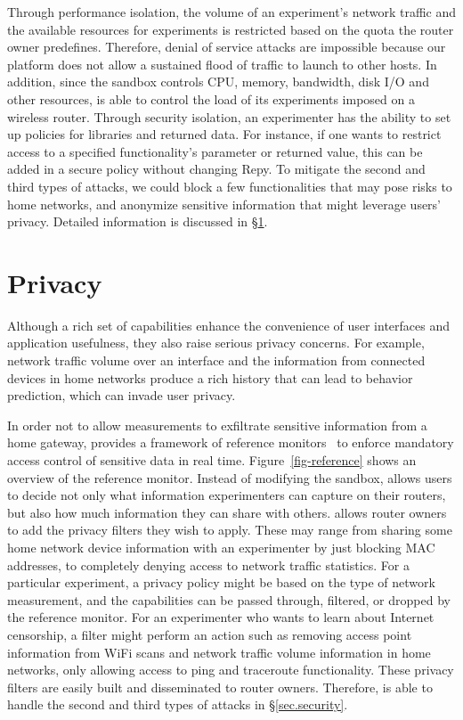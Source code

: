 Through performance isolation, the volume of an experiment's network traffic and the available resources for experiments is restricted based on the quota the router owner predefines. Therefore, denial of service attacks are impossible because our platform does not allow a sustained flood of traffic to launch to other hosts. In addition, since the sandbox controls CPU, memory, bandwidth, disk I/O and other resources, \sysname is able to control the load of its experiments imposed on a wireless router. Through security isolation, an experimenter has the ability to set up policies for libraries and returned data. For instance, if one wants to restrict access to a specified functionality's parameter or returned value, this can be added in a secure policy without changing Repy. To mitigate the second and third types of attacks, we could block a few functionalities that may pose risks to home networks, and anonymize sensitive information that might leverage users' privacy. Detailed information is discussed in \S{\ref{sec.privacy}}. 

\section{Privacy}
\label{sec.privacy}
Although a rich set of capabilities enhance the convenience of user interfaces and application usefulness, they also raise serious privacy concerns. For example, network traffic volume over an interface and the information from connected devices in home networks produce a rich history that can lead to behavior prediction, which can invade user privacy. 

In order not to allow measurements to exfiltrate sensitive information from a home gateway, \sysname provides a framework of reference monitors~\cite{ref} to enforce mandatory access control of sensitive data in real time. Figure~\ref{fig-reference} shows an overview of the reference monitor. Instead of modifying the sandbox, \sysname allows users to decide not only what information experimenters can capture on their routers, but also how much information they can share with others. \sysname allows router owners to add the privacy filters they wish to apply. These may range from sharing some home network device information with an experimenter by just blocking MAC addresses, to completely denying access to network traffic statistics. For a particular experiment, a privacy policy might be based on the type of network measurement, and the capabilities can be passed through, filtered, or dropped by the reference monitor. For an experimenter who wants to learn about Internet censorship, a filter might perform an action such as removing access point information from WiFi scans and network traffic volume information in home networks, only allowing access to ping and traceroute functionality. These privacy filters are easily built and disseminated to router owners. Therefore, \sysname is able to handle the second and third types of attacks in \S{\ref{sec.security}}. 

